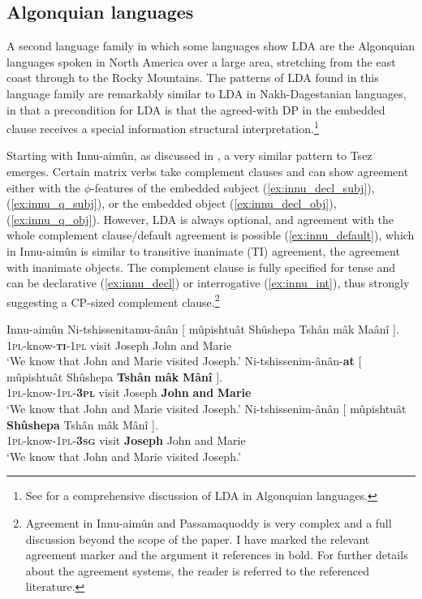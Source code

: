 \documentclass[output=paper
,modfonts
,nonflat]{langsci/langscibook}
\begin{document}
\subsection{Algonquian languages}

A second language family in which some languages show LDA are the Algonquian languages spoken in North America over a large area, stretching from the east coast through to the Rocky Mountains. The patterns of LDA found in this language family are remarkably similar to LDA in Nakh-Dagestanian languages, in that a precondition for LDA is that the agreed-with DP in the embedded clause receives a special information structural interpretation.\footnote{See \citet{Fry_Hamilton2014} for a comprehensive discussion of LDA in Algonquian languages.}

Starting with Innu-aim\^{u}n, as discussed in \citet[][B \& MK]{Branigan_MacKenzie2002}, a very similar pattern to Tsez emerges. Certain matrix verbs take complement clauses and can show agreement either with the $ \phi $-features of the embedded subject (\ref{ex:innu_decl_subj}), (\ref{ex:innu_q_subj}), or the embedded object (\ref{ex:innu_decl_obj}), (\ref{ex:innu_q_obj}). However, LDA is always optional, and agreement with the whole complement clause/default agreement is possible (\ref{ex:innu_default}), which in Innu-aim\^{u}n is similar to transitive inanimate (TI) agreement, the agreement with inanimate objects. The complement clause is fully specified for tense and can be declarative (\ref{ex:innu_decl}) or interrogative (\ref{ex:innu_int}), thus strongly suggesting a CP-sized complement clause.\footnote{Agreement in Innu-aim\^{u}n and Passamaquoddy is very complex and a full discussion beyond the scope of the paper. I have marked the relevant agreement marker and the argument it references in bold. For further details about the agreement systems, the reader is referred to the referenced literature.}
\begin{exe}
\ex Innu-aim\^{u}n \citep[][388]{Branigan_MacKenzie2002} \label{ex:innu_decl}
	\xlist
	\ex \label{ex:innu_default}
		\gll Ni-tshissenitamu-\^{a}n\^{a}n [ m\^{u}pishtu\^{a}t Sh\^{u}shepa Tsh\^{a}n m\^{a}k Ma\^{a}n\^{i} ].\\
			 \textsc{1pl}-know-\textsc{\textbf{ti}-1pl} {} visit Joseph John and Marie\\
		\glt `We know that John and Marie visited Joseph.'
	\ex \label{ex:innu_decl_subj}
		\gll Ni-tshissenim-\^{a}n\^{a}n-\textbf{at} [ m\^{u}pishtu\^{a}t Sh\^{u}shepa \textbf{Tsh\^{a}n} \textbf{m\^{a}k} \textbf{M\^{a}n\^{i}} ].\\
			 \textsc{1pl}-know-\textsc{1pl-\textbf{3pl}} {} visit Joseph \textbf{John} \textbf{and} \textbf{Marie}\\
		\glt `We know that John and Marie visited Joseph.'
	\ex \label{ex:innu_decl_obj}
		\gll Ni-tshissenim-\^{a}n\^{a}n [ m\^{u}pishtu\^{a}t \textbf{Sh\^{u}shepa} Tsh\^{a}n m\^{a}k M\^{a}n\^{i} ].\\
			 \textsc{1pl}-know-\textsc{1pl-\textbf{3sg}} {} visit \textbf{Joseph} John and Marie\\
		\glt `We know that John and Marie visited Joseph.'
	\endxlist
\end{exe}
\end{document}
